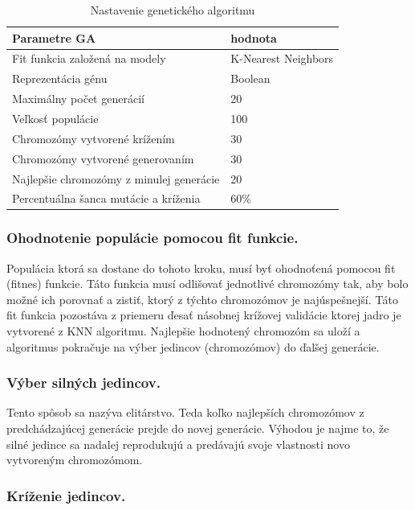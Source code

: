 \documentclass[runningheads]{llncs}
\begin{document}
\begin{table}[]
\centering
\caption{Nastavenie genetického algoritmu}\label{tab_nastavenie_gen_alg}
\begin{tabular}{|l|l|}
\hline
\textbf{Parametre GA}                    & \textbf{hodnota}  \\ \hline
Fit funkcia založená na modely           & K-Nearest Neighbors \\ \hline
Reprezentácia génu                       & Boolean  \\ \hline
Maximálny počet generácií                & 20       \\ \hline
Veľkosť populácie                        & 100      \\ \hline
Chromozómy vytvorené krížením            & 30       \\ \hline
Chromozómy vytvorené generovaním         & 30       \\ \hline
Najlepšie chromozómy z minulej generácie & 20       \\ \hline
Percentuálna šanca mutácie a kríženia    & 60\%     \\ \hline
\end{tabular}
\end{table}

\subsubsection{Ohodnotenie populácie pomocou fit funkcie.}

Populácia ktorá sa dostane do tohoto kroku, musí byť ohodnoťená pomocou fit (fitnes) funkcie. 
Táto funkcia musí odlišovať jednotlivé chromozómy tak, aby bolo možné ich porovnať a zistiť, ktorý
z týchto chromozómov je najúspešnejší. Táto fit funkcia pozostáva z priemeru ďesať násobnej krížovej validácie ktorej jadro
je vytvorené z KNN algoritmu. Najlepšie hodnotený chromozóm sa uloží a algoritmus pokračuje
na výber jedincov (chromozómov) do ďalšej generácie.

\subsubsection{Výber silných jedincov.}

Tento spôsob sa nazýva elitárstvo. Teda koľko najlepších chromozómov z predchádzajúcej generácie prejde
do novej generácie. Výhodou je najme to, že silné jedince sa nadalej reprodukujú a predávajú svoje vlastnosti
novo vytvoreným chromozómom.

\subsubsection{Kríženie jedincov.}
\end{document}

